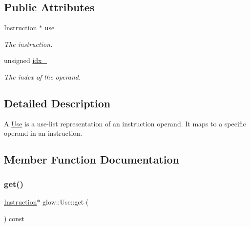 \subsection*{Public Attributes}
\begin{DoxyCompactItemize}
\item 
\mbox{\label{structglow_1_1_use_aa66d0e25704ede72afa291395e784d68}} 
\hyperlink{classglow_1_1_instruction}{Instruction} $\ast$ \hyperlink{structglow_1_1_use_aa66d0e25704ede72afa291395e784d68}{use\+\_\+}
\begin{DoxyCompactList}\small\item\em The instruction. \end{DoxyCompactList}\item 
\mbox{\label{structglow_1_1_use_a0aea951b1570ad4cab53b13df0b459af}} 
unsigned \hyperlink{structglow_1_1_use_a0aea951b1570ad4cab53b13df0b459af}{idx\+\_\+}
\begin{DoxyCompactList}\small\item\em The index of the operand. \end{DoxyCompactList}\end{DoxyCompactItemize}


\subsection{Detailed Description}
A \textquotesingle{}\hyperlink{structglow_1_1_use}{Use}\textquotesingle{} is a use-\/list representation of an instruction operand. It maps to a specific operand in an instruction. 

\subsection{Member Function Documentation}
\mbox{\label{structglow_1_1_use_a5cea7164405ca05e95eae7d516d1f412}} 
\subsubsection{\texorpdfstring{get()}{get()}}
{\footnotesize\ttfamily \hyperlink{classglow_1_1_instruction}{Instruction}$\ast$ glow\+::\+Use\+::get (\begin{DoxyParamCaption}{ }\end{DoxyParamCaption}) const\hspace{0.3cm}{\ttfamily [inline]}}

